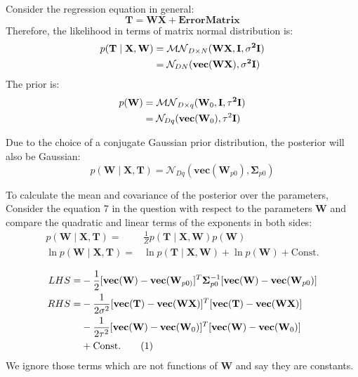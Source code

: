 \documentclass[12pt]{article}
\newenvironment{question}[2][Question]{\begin{trivlist}
\kern10pt
\item[\hskip \labelsep {\bfseries #1}\hskip \labelsep {\bfseries #2.}]}{\end{trivlist}}
\newcommand\numberthis{\addtocounter{equation}{1}\tag{\theequation}}
\begin{document}
\begin{question}{5}
Consider the regression equation in general:
$$\textbf{T} = \textbf{WX} + \textbf{ErrorMatrix} $$
Therefore, the likelihood in terms of matrix normal distribution is:
\begin{align*}
p(\bf{T}\mid \bf{X}, \bf{W}) &= 
  \mathcal{MN}_{D \times N}(\bf{WX}, \bf{I}, \sigma^2 \bf{I}) \\ 
  &= \mathcal{N}_{DN}(\bf{vec}(\bf{WX}), \sigma^2 \bf{I})
\end{align*}
The prior is:
\begin{align*}
p(\bf{W}) &= 
  \mathcal{MN}_{D \times q}(\textbf{W}_0, \bf{I}, \tau^2 \bf{I}) \\
  &= \mathcal{N}_{Dq}(\textbf{vec}(\textbf{W}_0), \tau^2 \bf{I})
\end{align*}

Due to the choice of a conjugate Gaussian prior distribution, the posterior will 
also be Gaussian:
$$
p(\textbf{W}\mid \textbf{X}, \textbf{T}) =
  \mathcal{N}_{Dq}(\textbf{vec}(\textbf{W}_{p0}), \bm{\Sigma}_{p0} )
$$

To calculate the mean and covariance of the posterior over the parameters,
Consider the equation 7 in the question with respect to the parameters $\textbf{W}$
 and compare the quadratic and linear terms of the exponents in both sides:
\begin{align*}
  p(\textbf{W}\mid \textbf{X}, \textbf{T}) =&
  \frac{1}{Z}p(\textbf{T}\mid \textbf{X}, \textbf{W})p(\textbf{W})  \\
  \ln p(\textbf{W}\mid \textbf{X}, \textbf{T}) =&
  \ln p(\textbf{T}\mid \textbf{X}, \textbf{W}) + \ln p(\textbf{W}) + \text{Const.} \\
\end{align*}
\begin{align*}
  LHS =& -\frac12[\textbf{vec}(\textbf{W}) - \textbf{vec}(\textbf{W}_{p0)}]^T
          \bm{\Sigma}_{p0}^{-1}[\textbf{vec}(\textbf{W})-\textbf{vec}(\textbf{W}_{p0})] \\
  RHS =& -\frac{1}{2\sigma^2}[\textbf{vec}(\textbf{T}) - \textbf{vec}(\textbf{WX})]^T
                             [\textbf{vec}(\textbf{T}) - \textbf{vec}(\textbf{WX})] \\
       &-\frac{1}{2\tau^2}[\textbf{vec}(\textbf{W}) - \textbf{vec}(\textbf{W}_0)]^T
                          [\textbf{vec}(\textbf{W}) - \textbf{vec}(\textbf{W}_0)] \\
       &+\text{Const.} \numberthis \label{eq:Q5-loglike-RHS}
\end{align*}
We ignore those terms which are not functions of $\mathbf{W}$ and say they are constants.


\end{question}
\end{document}
